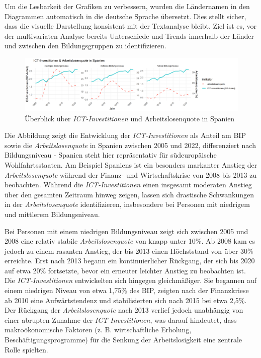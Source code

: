 Um die Lesbarkeit der Grafiken zu verbessern, wurden die Ländernamen in den Diagrammen 
automatisch in die deutsche Sprache übersetzt. Dies stellt sicher, dass die visuelle 
Darstellung konsistent mit der Textanalyse bleibt. Ziel ist es, vor der multivariaten Analyse 
bereits Unterschiede und Trends innerhalb der Länder und zwischen den Bildungsgruppen zu 
identifizieren.

\begin{figure}[htbp]
    \centering
    \includegraphics[width=\textwidth]{assets/plot_spain_final.png}
    \caption{Überblick über \textit{\ac{ICT}-Investitionen} und Arbeitslosenquote in 
    Spanien}
    \label{fig:spain}
\end{figure}

Die Abbildung zeigt die Entwicklung der \textit{\ac{ICT}-Investitionen} als Anteil am 
BIP sowie die \textit{Arbeitslosenquote} in Spanien zwischen 2005 und 2022, differenziert 
nach Bildungsniveau - Spanien steht hier repräsentativ für südeuropäische Wohlfahrtsstaaten. 
Am Beispiel Spaniens ist ein besonders markanter Anstieg der \textit{Arbeitslosenquote} 
während der Finanz- und Wirtschaftskrise von 2008 bis 2013 zu beobachten. Während die 
\textit{\ac{ICT}-Investitionen} einen insgesamt moderaten Anstieg über den gesamten 
Zeitraum hinweg zeigen, lassen sich drastische Schwankungen in der 
\textit{Arbeitslosenquote} identifizieren, insbesondere bei Personen mit niedrigem und 
mittlerem Bildungsniveau.

Bei Personen mit einem niedrigen Bildungsniveau zeigt sich zwischen 2005 und 2008 
eine relativ stabile \textit{Arbeitslosenquote} von knapp unter 10\%. Ab 2008 kam es 
jedoch zu einem rasanten Anstieg, der bis 2013 einen Höchststand von über 30\% erreichte. 
Erst nach 2013 begann ein kontinuierlicher Rückgang, der sich bis 2020 auf etwa 20\% 
fortsetzte, bevor ein erneuter leichter Anstieg zu beobachten ist. Die 
\textit{\ac{ICT}-Investitionen} entwickelten sich hingegen gleichmäßiger. Sie begannen 
auf einem niedrigen Niveau von etwa 1,75\% des BIP, zeigten nach der Finanzkriese ab 
2010 eine Aufwärtstendenz und stabilisierten sich nach 2015 bei etwa 2,5\%. Der 
Rückgang der \textit{Arbeitslosenquote} nach 2013 verlief jedoch unabhängig von einer 
abrupten Zunahme der \textit{\ac{ICT}-Investitionen}, was darauf hindeutet, dass 
makroökonomische Faktoren (z. B. wirtschaftliche Erholung, Beschäftigungsprogramme) 
für die Senkung der Arbeitslosigkeit eine zentrale Rolle spielten.

